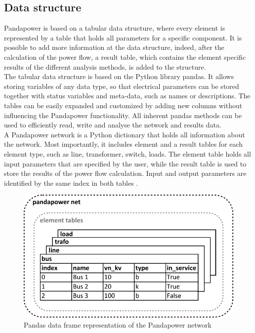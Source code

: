 \subsection{Data structure}
Pandapower is based on a tabular data structure, where every element is represented by a table that holds all parameters for a specific component. It is possible to add more information at the data structure, indeed, after the calculation of the power flow, a result table, which contains the element specific results of the different analysis methods, is added to the structure. \\
The tabular data structure is based on the Python library pandas. It allows storing variables of any data type, so that electrical parameters can be stored together with status variables and meta-data, such as names or descriptions. The tables can be easily expanded and customized by adding new columns without influencing the Pandapower functionality. All inherent pandas methods can be used to efficiently read, write and analyse the network and results data. \\

A Pandapower network is a Python dictionary that holds all information about the network. Most importantly, it includes element and a result tables for each element type, such as line, transformer, switch, loads. The element table holds all input parameters that are specified by the user, while the result table is used to store the results of the power flow calculation. Input and output parameters are identified by the same index in both tables \cite{pandapower}.

\begin{figure}[H]
\centering
    \includegraphics[width=.6\linewidth]{images/Background/Pandapower/Pandapower_net.pdf}
\caption{Pandas data frame representation of the Pandapower network}
\end{figure}



